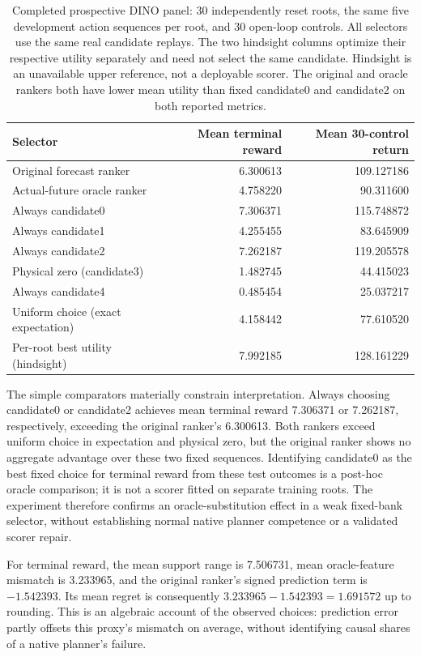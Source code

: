 \documentclass[11pt]{article}
\begin{document}
\begin{table}[t]
\centering
\small
\begin{tabular}{lrr}
\toprule
Selector & Mean terminal reward & Mean 30-control return\\
\midrule
Original forecast ranker & 6.300613 & 109.127186\\
Actual-future oracle ranker & 4.758220 & 90.311600\\
\midrule
Always candidate0 & 7.306371 & 115.748872\\
Always candidate1 & 4.255455 & 83.645909\\
Always candidate2 & 7.262187 & 119.205578\\
Physical zero (candidate3) & 1.482745 & 44.415023\\
Always candidate4 & 0.485454 & 25.037217\\
Uniform choice (exact expectation) & 4.158442 & 77.610520\\
Per-root best utility (hindsight) & 7.992185 & 128.161229\\
\bottomrule
\end{tabular}
\caption{Completed prospective DINO panel: 30 independently reset roots,
the same five development action sequences per root, and 30 open-loop controls.
All selectors use the same real candidate replays. The two hindsight columns
optimize their respective utility separately and need not select the same
candidate. Hindsight is an unavailable upper reference, not a deployable scorer.
The original and oracle rankers both have lower mean utility than fixed
candidate0 and candidate2 on both reported metrics.}
\label{tab:dino-prospective}
\end{table}

The simple comparators materially constrain interpretation. Always choosing
candidate0 or candidate2 achieves mean terminal reward 7.306371 or 7.262187,
respectively, exceeding the original ranker's 6.300613. Both rankers exceed
uniform choice in expectation and physical zero, but the original ranker
shows no aggregate advantage over these two fixed sequences. Identifying
candidate0 as the best fixed choice for terminal reward from these test
outcomes is a post-hoc oracle comparison; it is not a scorer fitted on separate
training roots. The experiment therefore confirms an oracle-substitution
effect in a weak fixed-bank selector, without establishing normal native
planner competence or a validated scorer repair.

For terminal reward, the mean support range is 7.506731, mean oracle-feature
mismatch is 3.233965, and the original ranker's signed prediction term is
$-1.542393$. Its mean regret is consequently
$3.233965-1.542393=1.691572$ up to rounding. This is an algebraic account of
the observed choices: prediction error partly offsets this proxy's mismatch
on average, without identifying causal shares of a native planner's failure.
\end{document}

